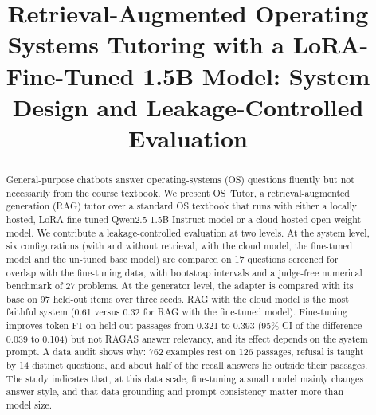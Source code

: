 \documentclass[conference]{IEEEtran}
\begin{document}
\title{Retrieval-Augmented Operating Systems Tutoring with a LoRA-Fine-Tuned 1.5B Model: System Design and Leakage-Controlled Evaluation}

\author{
\and
{}
\and
{}
}

\maketitle

\begin{abstract}
General-purpose chatbots answer operating-systems (OS) questions fluently but not necessarily from the course textbook. We present OS~Tutor, a retrieval-augmented generation (RAG) tutor over a standard OS textbook that runs with either a locally hosted, LoRA-fine-tuned Qwen2.5-1.5B-Instruct model or a cloud-hosted open-weight model. We contribute a leakage-controlled evaluation at two levels. At the system level, six configurations (with and without retrieval, with the cloud model, the fine-tuned model and the un-tuned base model) are compared on 17 questions screened for overlap with the fine-tuning data, with bootstrap intervals and a judge-free numerical benchmark of 27 problems. At the generator level, the adapter is compared with its base on 97 held-out items over three seeds. RAG with the cloud model is the most faithful system (0.61 versus 0.32 for RAG with the fine-tuned model). Fine-tuning improves token-F1 on held-out passages from 0.321 to 0.393 (95\% CI of the difference 0.039 to 0.104) but not RAGAS answer relevancy, and its effect depends on the system prompt. A data audit shows why: 762 examples rest on 126 passages, refusal is taught by 14 distinct questions, and about half of the recall answers lie outside their passages. The study indicates that, at this data scale, fine-tuning a small model mainly changes answer style, and that data grounding and prompt consistency matter more than model size.
\end{abstract}
\end{document}

